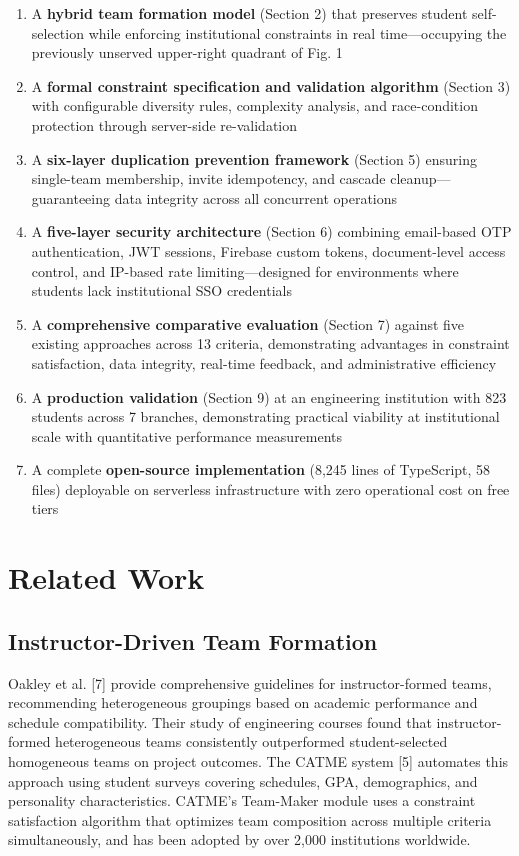 \documentclass[12pt,a4paper]{article}
\begin{document}
\begin{enumerate}[noitemsep,topsep=3pt]
    \item A \textbf{hybrid team formation model} (Section 2) that preserves student self-selection while enforcing institutional constraints in real time---occupying the previously unserved upper-right quadrant of Fig. 1
    \item A \textbf{formal constraint specification and validation algorithm} (Section 3) with configurable diversity rules, complexity analysis, and race-condition protection through server-side re-validation
    \item A \textbf{six-layer duplication prevention framework} (Section 5) ensuring single-team membership, invite idempotency, and cascade cleanup---guaranteeing data integrity across all concurrent operations
    \item A \textbf{five-layer security architecture} (Section 6) combining email-based OTP authentication, JWT sessions, Firebase custom tokens, document-level access control, and IP-based rate limiting---designed for environments where students lack institutional SSO credentials
    \item A \textbf{comprehensive comparative evaluation} (Section 7) against five existing approaches across 13 criteria, demonstrating advantages in constraint satisfaction, data integrity, real-time feedback, and administrative efficiency
    \item A \textbf{production validation} (Section 9) at an engineering institution with 823 students across 7 branches, demonstrating practical viability at institutional scale with quantitative performance measurements
    \item A complete \textbf{open-source implementation} (8,245 lines of TypeScript, 58 files) deployable on serverless infrastructure with zero operational cost on free tiers
\end{enumerate}

\section{Related Work}

\subsection{Instructor-Driven Team Formation}

Oakley et al. [7] provide comprehensive guidelines for instructor-formed teams, recommending heterogeneous groupings based on academic performance and schedule compatibility. Their study of engineering courses found that instructor-formed heterogeneous teams consistently outperformed student-selected homogeneous teams on project outcomes. The CATME system [5] automates this approach using student surveys covering schedules, GPA, demographics, and personality characteristics. CATME's Team-Maker module uses a constraint satisfaction algorithm that optimizes team composition across multiple criteria simultaneously, and has been adopted by over 2,000 institutions worldwide.
\end{document}
